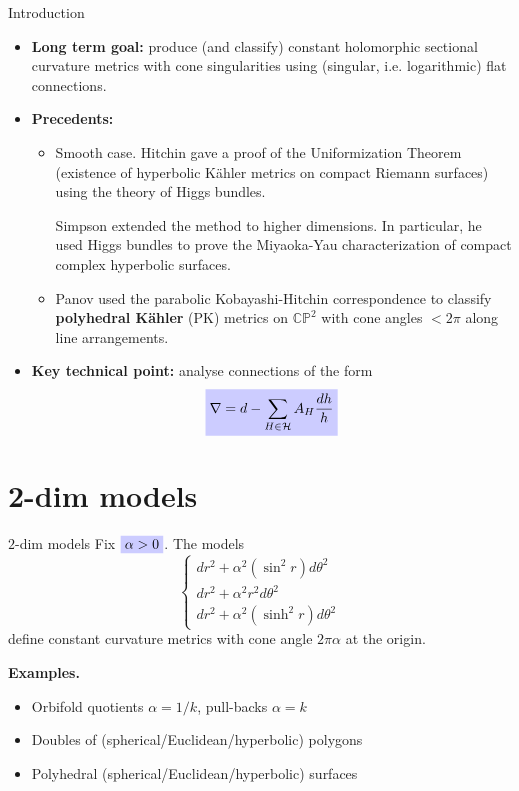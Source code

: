 \documentclass{beamer}
\newcommand{\CP}{\mathbb{CP}}
\newcommand{\mathcolorbox}[2]{\colorbox{#1}{$\displaystyle #2$}}
\begin{document}
\begin{frame}{Introduction}
	\begin{itemize}
		\item \textbf{Long term goal:} produce (and classify) constant holomorphic sectional curvature metrics with cone singularities using (singular, i.e. logarithmic) flat connections.
		
		\item \textbf{Precedents:} 
		\begin{itemize}
			\item Smooth case. Hitchin gave a proof of the Uniformization Theorem (existence of hyperbolic K\"ahler metrics on compact Riemann surfaces) using the theory of Higgs bundles. 
			
			Simpson extended the method to higher dimensions. In particular, he used Higgs bundles to prove the Miyaoka-Yau characterization of compact complex hyperbolic surfaces.
			
			\item Panov used the parabolic Kobayashi-Hitchin correspondence to classify \textbf{polyhedral K\"ahler} (PK) metrics on \(\CP^2\) with cone angles \(<2\pi\) along line arrangements.
		\end{itemize}
	
	\item \textbf{Key technical point:} analyse connections of the form
	\[ \mathcolorbox{blue!20}{
		\nabla = d - \sum_{H \in \mathcal{H}} A_H \frac{dh}{h} 
	}
	\]
	
	\end{itemize}
\end{frame}

\section{2-dim models}

\begin{frame}{\(2\)-dim models}
	Fix \(\mathcolorbox{blue!20}{\alpha>0}\). The models
	\[
	\begin{cases}
	dr^2 + \alpha^2 (\sin^2r) d\theta^2 \\
	dr^2 + \alpha^2 r^2 d\theta^2 \\
	dr^2 + \alpha^2 (\sinh^2r) d\theta^2 	
	\end{cases}
	\]
	define constant curvature metrics with cone angle \(2\pi\alpha\) at the origin.
	
	\textbf{Examples.}
	
	\begin{itemize}
		\item Orbifold quotients \(\alpha=1/k\), pull-backs \(\alpha=k\)
		\item Doubles of (spherical/Euclidean/hyperbolic) polygons
		\item Polyhedral (spherical/Euclidean/hyperbolic) surfaces
	\end{itemize}
\end{frame}
\end{document}
